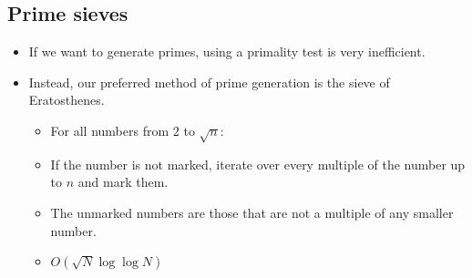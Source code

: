 \documentclass[12pt,t]{beamer}
\newcommand{\bi}{\begin{itemize}}
\newcommand{\ei}{\end{itemize}}
\begin{document}
\subsection{Prime sieves}
\begin{frame}[fragile]
  \bi
    \item If we want to generate primes, using a primality test is very inefficient.
    \item Instead, our preferred method of prime generation is the sieve of Eratosthenes.
      \bi
        \item For all numbers from $2$ to $\sqrt{n}$:
        \item If the number is not marked, iterate over every multiple of the
          number up to $n$ and mark them.
        \item The unmarked numbers are those that are not a multiple of any
          smaller number.
        \item $O(\sqrt{N}\log \log N)$
      \ei
  \ei
  \begin{columns}[T]
    \begin{column}{.7\textwidth}
      \centering



\end{column}
\end{columns}
\end{frame}
\end{document}
